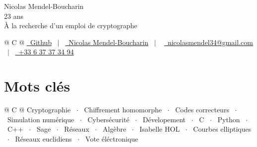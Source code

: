 \documentclass[a4paper,12pt]{article}
\begin{document}
\pagestyle{empty} 



\Huge{Nicolas Mendel-Boucharin} \\
\normalsize{23 ans}\\
À la recherche d'un emploi de cryptographe \\

\begin{tabularx}{\linewidth}{@{} C @{}}
\href{https://github.com/NicolasMendelBoucharin}{\raisebox{-0.05\height}\faGithub\ Github} \ $|$ \ 
\href{https://www.linkedin.com/in/nicolas-mendel-boucharin-1b456a17a/}{\raisebox{-0.05\height}\faLinkedin\ Nicolas Mendel-Boucharin} \ $|$ \ 
\href{nicolasmendel34@gmail.com}{\raisebox{-0.05\height}\faEnvelope \ nicolasmendel34@gmail.com} \ $|$ \ 
\href{tel:+33637373494}{\raisebox{-0.05\height}\faMobile \ +33 6 37 37 34 94} \\
\end{tabularx}


\section{Mots clés}
\begin{tabularx}{\linewidth}{@{} C @{}}
Cryptographie \ $\cdot$ \
Chiffrement homomorphe \ $\cdot$ \
Codes correcteurs \ $\cdot$ \
Simulation numérique \ $\cdot$ \
Cybersécurité \ $\cdot$ \
Dévelopement \ $\cdot$ \
C \ $\cdot$ \
Python \ $\cdot$ \
C++ \ $\cdot$ \
Sage \ $\cdot$ \
Réseaux \ $\cdot$ \
Algèbre \ $\cdot$ \
Isabelle HOL \ $\cdot$ \
Courbes elliptiques \ $\cdot$ \
Réseaux euclidiens \ $\cdot$ \
Vote éléctronique \\
\end{tabularx}
\end{document}
